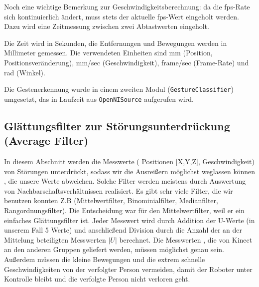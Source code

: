 Noch eine wichtige Bemerkung zur Geschwindigkeitsberechnung: da die \gls{fps}-Rate
 sich kontinuierlich ändert, muss stets der aktuelle \gls{fps}-Wert eingeholt werden.
 Dazu wird eine Zeitmessung zwischen zwei Abtastwerten eingeholt.

Die Zeit wird in Sekunden, die Entfernungen und Bewegungen werden in Millimeter gemessen.
 Die verwendeten Einheiten sind mm (Position, Positionsveränderung), mm/sec
 (Geschwindigkeit), frame/sec (Frame-Rate) und rad (Winkel).

Die Gestenerkennung wurde in einem zweiten Modul (\lstinline{GestureClassifier})
umgesetzt, das in Laufzeit aus \lstinline{OpenNISource} aufgerufen wird.


\subsection{Glättungsfilter zur Störungsunterdrückung (Average Filter)}

In diesem Abschnitt werden die Messwerte ( Positionen [X,Y,Z], Geschwindigkeit) von Störungen unterdrückt, sodass wir die  Ausreißern möglichst weglassen  können , die unsere Werte abweichen. Solche Filter werden meistens durch Auswertung von Nachbarschaftsverhältnissen realisiert. 
Es gibt sehr viele Filter, die wir benutzen konnten Z.B (Mittelwertfilter, Binominialfilter, Medianfilter, Rangordnungsfilter). Die Entscheidung war für den Mittelwertfilter, weil er ein einfaches Glättungsfilter ist. Jeder Messwert wird durch Addition der U-Werte (in unserem Fall 5 Werte)  und anschließend Division durch die Anzahl der an der Mittelung beteiligten Messwerten $|U|$ berechnet.
Die Messwerten , die von Kinect an den anderen Gruppen geliefert werden, müssen möglichst genau sein. Außerdem müssen die kleine Bewegungen und die extrem schnelle Geschwindigkeiten von der verfolgter Person vermeiden, damit der Roboter unter Kontrolle bleibt und die verfolgte Person nicht verloren geht.




